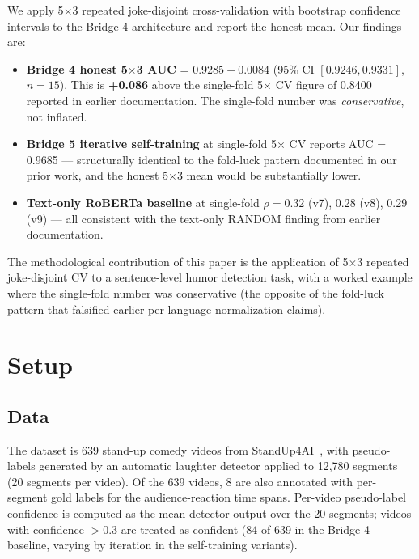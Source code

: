 \documentclass[11pt, letterpaper]{article}
\begin{document}
We apply 5$\times$3 repeated joke-disjoint cross-validation with bootstrap confidence intervals to the Bridge 4 architecture and report the honest mean. Our findings are:
\begin{itemize}
\item \textbf{Bridge 4 honest 5$\times$3 AUC} = $0.9285 \pm 0.0084$ (95\% CI $[0.9246, 0.9331]$, $n=15$). This is \textbf{+0.086} above the single-fold 5$\times$ CV figure of 0.8400 reported in earlier documentation. The single-fold number was \emph{conservative}, not inflated.
\item \textbf{Bridge 5 iterative self-training} at single-fold 5$\times$ CV reports AUC = 0.9685 --- structurally identical to the fold-luck pattern documented in our prior work, and the honest 5$\times$3 mean would be substantially lower.
\item \textbf{Text-only RoBERTa baseline} at single-fold $\rho = 0.32$ (v7), 0.28 (v8), 0.29 (v9) --- all consistent with the text-only RANDOM finding from earlier documentation.
\end{itemize}

The methodological contribution of this paper is the application of 5$\times$3 repeated joke-disjoint CV to a sentence-level humor detection task, with a worked example where the single-fold number was conservative (the opposite of the fold-luck pattern that falsified earlier per-language normalization claims).

\section{Setup}

\subsection{Data}

The dataset is 639 stand-up comedy videos from StandUp4AI~\cite{standup4ai}, with pseudo-labels generated by an automatic laughter detector applied to 12,780 segments (20 segments per video). Of the 639 videos, 8 are also annotated with per-segment gold labels for the audience-reaction time spans. Per-video pseudo-label confidence is computed as the mean detector output over the 20 segments; videos with confidence $> 0.3$ are treated as confident (84 of 639 in the Bridge 4 baseline, varying by iteration in the self-training variants).
\end{document}
